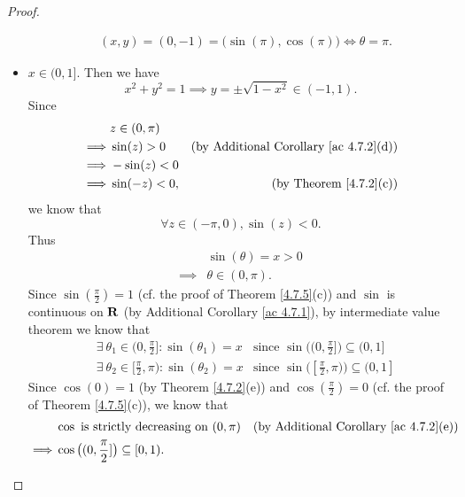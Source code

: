 \begin{proof}
\begin{itemize}
\begin{align*}
                   & (x, y) = (0, -1) = \big(\sin(\pi), \cos(\pi)\big) \iff \theta = \pi.
              \end{align*}
        \item \(x \in (0, 1]\).
              Then we have
              \[
                  x^2 + y^2 = 1 \implies y = \pm \sqrt{1 - x^2} \in (-1, 1).
              \]
              Since
              \begin{align*}
                           & z \in (0, \pi)                                                      \\
                  \implies & \sin(z) > 0    & \text{(by Additional Corollary \ref{ac 4.7.2}(d))} \\
                  \implies & -\sin(z) < 0                                                        \\
                  \implies & \sin(-z) < 0,  & \text{(by Theorem \ref{4.7.2}(c))}
              \end{align*}
              we know that
              \[
                  \forall z \in (-\pi, 0), \sin(z) < 0.
              \]
              Thus
              \begin{align*}
                           & \sin(\theta) = x > 0 \\
                  \implies & \theta \in (0, \pi).
              \end{align*}
              Since \(\sin(\frac{\pi}{2}) = 1\) (cf. the proof of Theorem \ref{4.7.5}(c)) and \(\sin\) is continuous on \(\mathbf{R}\) (by Additional Corollary \ref{ac 4.7.1}), by intermediate value theorem we know that
              \begin{align*}
                   & \exists\ \theta_1 \in (0, \frac{\pi}{2}] : \sin(\theta_1) = x   & \text{since } \sin\big((0, \frac{\pi}{2}]\big) \subseteq (0, 1]   \\
                   & \exists\ \theta_2 \in [\frac{\pi}{2}, \pi) : \sin(\theta_2) = x & \text{since } \sin\big([\frac{\pi}{2}, \pi)\big) \subseteq (0, 1]
              \end{align*}
              Since \(\cos(0) = 1\) (by Theorem \ref{4.7.2}(e)) and \(\cos(\frac{\pi}{2}) = 0\) (cf. the proof of Theorem \ref{4.7.5}(c)), we know that
              \begin{align*}
                           & \cos \text{ is strictly decreasing on } (0, \pi)   & \text{(by Additional Corollary \ref{ac 4.7.2}(e))} \\
                  \implies & \cos\big((0, \frac{\pi}{2}]\big) \subseteq [0, 1).

\end{align*}
\end{itemize}
\end{proof}
